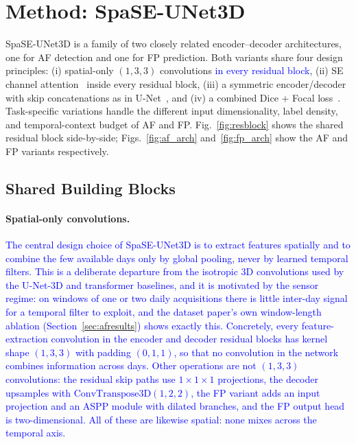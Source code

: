 \documentclass[sensors,article,submit,moreauthors,pdftex]{Definitions/mdpi}
\newcommand{\rev}[1]{\textcolor{blue}{#1}}
\begin{document}
\FloatBarrier
\section{Method: SpaSE-UNet3D}
\label{sec:method}

SpaSE-UNet3D is a family of two closely related encoder--decoder architectures, one for AF detection and one for FP prediction. Both variants share four design principles: (i) spatial-only $(1,3,3)$ convolutions \rev{in every residual block}, (ii) SE channel attention~\cite{hu2018squeeze} inside every residual block, (iii) a symmetric encoder/decoder with skip concatenations as in U-Net~\cite{ronneberger2015unet,cciccek20163d}, and (iv) a combined Dice + Focal loss~\cite{milletari2016v,lin2017focal}. Task-specific variations handle the different input dimensionality, label density, and temporal-context budget of AF and FP. Fig.~\ref{fig:resblock} shows the shared residual block side-by-side; Figs.~\ref{fig:af_arch} and~\ref{fig:fp_arch} show the AF and FP variants respectively.

\subsection{Shared Building Blocks}

\paragraph*{Spatial-only convolutions.} \rev{The central design choice of
SpaSE-UNet3D is to extract features spatially and to combine the few available
days only by global pooling, never by learned temporal filters. This is a
deliberate departure from the isotropic 3D convolutions used by the U-Net-3D and
transformer baselines, and it is motivated by the sensor regime: on windows of
one or two daily acquisitions there is little inter-day signal for a temporal
filter to exploit, and the dataset paper's own window-length ablation
(Section~\ref{sec:afresults}) shows exactly this. Concretely, every
feature-extraction convolution in the encoder and decoder residual blocks has kernel shape $(1, 3, 3)$ with padding $(0, 1, 1)$, so that no convolution in the network combines information across days. Other operations are not $(1,3,3)$ convolutions: the residual skip paths use $1 \times 1 \times 1$ projections, the decoder upsamples with $\mathrm{ConvTranspose3D}(1, 2, 2)$, the FP variant adds an input projection and an ASPP module with dilated branches, and the FP output head is two-dimensional. All of these are likewise spatial: none mixes across the temporal axis.}
\end{document}
